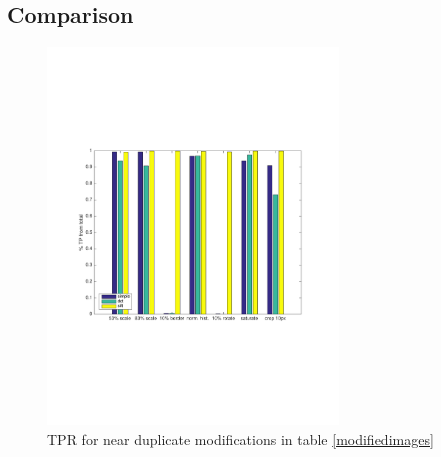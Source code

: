 \documentclass[english,12pt,a4paper,pdftex,elec,utf8]{aaltothesis}
\begin{document}

\subsection{Comparison}

\begin{figure}[htb]
\begin{center}
\includegraphics[height=10cm]{figures/tpBar}
\end{center}
\caption{ TPR for near duplicate modifications in table \ref{modifiedimages} }
\label{tptotal}
\end{figure}
\end{document}
